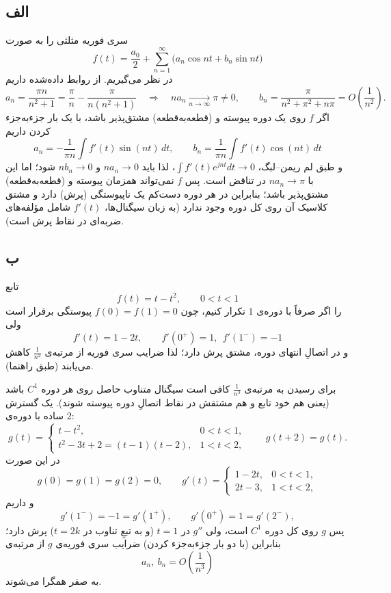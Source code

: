 \subsection*{الف}
سری فوریه مثلثی را به صورت
\[
f(t)=\frac{a_0}{2}+\sum_{n=1}^{\infty}\big(a_n\cos nt+b_n\sin nt\big)
\]
در نظر می‌گیریم. از روابط داده‌شده داریم
\[
a_n=\frac{\pi n}{n^2+1}= \frac{\pi}{n}-\frac{\pi}{n(n^2+1)}
\quad\Longrightarrow\quad
n a_n \xrightarrow[n\to\infty]{}\pi\neq 0,
\qquad
b_n=\frac{\pi}{n^2+\pi^2+n\pi}=O\!\left(\frac{1}{n^2}\right).
\]
اگر $f$ روی یک دوره پیوسته و (قطعه‌به‌قطعه) مشتق‌پذیر باشد، با یک بار جزءبه‌جزء کردن داریم
\[
a_n=-\frac{1}{\pi n}\int f'(t)\sin(nt)\,dt,\qquad
b_n=\frac{1}{\pi n}\int f'(t)\cos(nt)\,dt
\]
و طبق لم ریمن--لبگ، $\int f'(t)e^{jnt}dt\to 0$، لذا باید $n a_n\to 0$ و $n b_n\to 0$ شود؛
اما این با $n a_n\to\pi$ در تناقض است. پس $f$ نمی‌تواند همزمان پیوسته و (قطعه‌به‌قطعه) مشتق‌پذیر باشد؛
بنابراین در هر دوره دست‌کم یک ناپیوستگی (پرش) دارد و مشتق کلاسیک آن روی کل دوره وجود ندارد
(به زبان سیگنال‌ها، $f'(t)$ شامل مؤلفه‌های ضربه‌ای در نقاط پرش است).

\subsection*{ب}
تابع
\[
f(t)=t-t^2,\qquad 0<t<1
\]
را اگر صرفاً با دوره‌ی $1$ تکرار کنیم، چون $f(0)=f(1)=0$ پیوستگی برقرار است ولی
\[
f'(t)=1-2t,\qquad f'(0^+)=1,\ \ f'(1^-)= -1
\]
و در اتصالِ انتهای دوره، مشتق پرش دارد؛ لذا ضرایب سری فوریه از مرتبه‌ی $\frac{1}{n^2}$ کاهش می‌یابند (طبق راهنما).

برای رسیدن به مرتبه‌ی $\frac{1}{n^3}$ کافی است سیگنال متناوب حاصل روی هر دوره $C^1$ باشد (یعنی هم خود تابع و هم مشتقش در نقاط اتصالِ دوره پیوسته شوند).
یک گسترش ساده با دوره‌ی $2$:
\[
g(t)=
\begin{cases}
t-t^2, & 0<t<1,\\
t^2-3t+2=(t-1)(t-2), & 1<t<2,
\end{cases}
\qquad g(t+2)=g(t).
\]
در این صورت
\[
g(0)=g(1)=g(2)=0,
\qquad
g'(t)=
\begin{cases}
1-2t, & 0<t<1,\\
2t-3, & 1<t<2,
\end{cases}
\]
و داریم
\[
g'(1^-)= -1 = g'(1^+),\qquad g'(0^+)=1=g'(2^-),
\]
پس $g$ روی کل دوره $C^1$ است، ولی $g''$ در $t=1$ (و به تبعِ تناوب در $t=2k$) پرش دارد؛
بنابراین (با دو بار جزءبه‌جزء کردن) ضرایب سری فوریه‌ی $g$ از مرتبه‌ی
\[
a_n,\ b_n = O\!\left(\frac{1}{n^3}\right)
\]
به صفر همگرا می‌شوند.